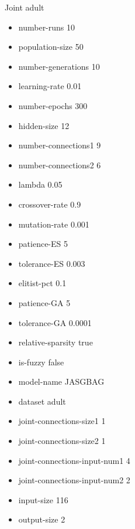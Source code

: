 Joint
adult
\begin{itemize}
\item number-runs 10
\item population-size 50
\item number-generations 10
\item learning-rate 0.01
\item number-epochs 300
\item hidden-size 12
\item number-connections1 9
\item number-connections2 6
\item lambda 0.05
\item crossover-rate 0.9
\item mutation-rate 0.001
\item patience-ES 5
\item tolerance-ES 0.003
\item elitist-pct 0.1
\item patience-GA 5
\item tolerance-GA 0.0001
\item relative-sparsity true
\item is-fuzzy false
\item model-name JASGBAG
\item dataset adult
\item joint-connections-size1 1
\item joint-connections-size2 1
\item joint-connections-input-num1 4
\item joint-connections-input-num2 2
\item input-size 116
\item output-size 2
\end{itemize}

